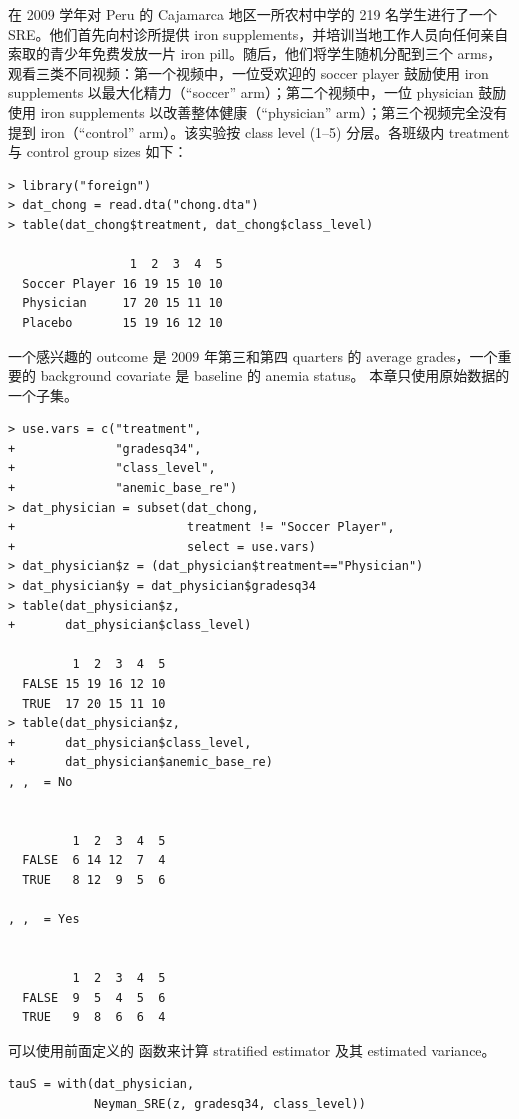 \citet{chong2016iron} 在 2009 学年对 Peru 的 Cajamarca 地区一所农村中学的 219 名学生进行了一个 SRE。他们首先向村诊所提供 iron supplements，并培训当地工作人员向任何亲自索取的青少年免费发放一片 iron pill。随后，他们将学生随机分配到三个 arms，观看三类不同视频：第一个视频中，一位受欢迎的 soccer player 鼓励使用 iron supplements 以最大化精力（``soccer'' arm）；第二个视频中，一位 physician 鼓励使用 iron supplements 以改善整体健康（``physician'' arm）；第三个视频完全没有提到 iron（``control'' arm）。该实验按 class level (1--5) 分层。各班级内 treatment 与 control group sizes 如下：

\begin{lstlisting}
> library("foreign")
> dat_chong = read.dta("chong.dta")
> table(dat_chong$treatment, dat_chong$class_level)
               
                 1  2  3  4  5
  Soccer Player 16 19 15 10 10
  Physician     17 20 15 11 10
  Placebo       15 19 16 12 10
\end{lstlisting}

一个感兴趣的 outcome 是 2009 年第三和第四 quarters 的 average grades，一个重要的 background covariate 是 baseline 的 anemia status。
本章只使用原始数据的一个子集。

\begin{lstlisting}
> use.vars = c("treatment", 
+              "gradesq34", 
+              "class_level", 
+              "anemic_base_re")
> dat_physician = subset(dat_chong,
+                        treatment != "Soccer Player",
+                        select = use.vars)
> dat_physician$z = (dat_physician$treatment=="Physician")
> dat_physician$y = dat_physician$gradesq34
> table(dat_physician$z, 
+       dat_physician$class_level)
       
         1  2  3  4  5
  FALSE 15 19 16 12 10
  TRUE  17 20 15 11 10
> table(dat_physician$z, 
+       dat_physician$class_level,
+       dat_physician$anemic_base_re)
, ,  = No

       
         1  2  3  4  5
  FALSE  6 14 12  7  4
  TRUE   8 12  9  5  6

, ,  = Yes

       
         1  2  3  4  5
  FALSE  9  5  4  5  6
  TRUE   9  8  6  6  4
\end{lstlisting}

 
可以使用前面定义的  函数来计算 stratified estimator 及其 estimated variance。
\begin{lstlisting}
tauS = with(dat_physician,
            Neyman_SRE(z, gradesq34, class_level))
\end{lstlisting}

